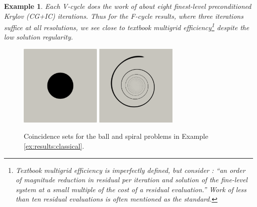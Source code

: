 \documentclass[letterpaper,final,12pt,reqno]{amsart}
\theoremstyle{cstyle}
\theoremstyle{cstyle*}
\theoremstyle{dstyle}
\newtheorem{example}[theorem]{Example}
\numberwithin{equation}{section}
\numberwithin{figure}{section}
\numberwithin{table}{section}
\numberwithin{theorem}{section}
\begin{document}
\begin{example}
Each V-cycle does the work of about eight finest-level preconditioned Krylov (CG+IC) iterations.  Thus for the F-cycle results, where three iterations suffice at all resolutions, we see close to textbook multigrid efficiency\footnote{Textbook multigrid efficiency is imperfectly defined, but consider \cite{BrownSmithAhmadia2013}: ``an order of magnitude reduction in residual per iteration and solution of the fine-level system at a small multiple of the cost of a residual evaluation.''  Work of less than ten residual evaluations is often mentioned as the standard.} despite the low solution regularity.
\end{example}

\begin{figure}[ht]
\begin{center}
\includegraphics[width=0.35\textwidth]{fixfigs/ball-set.png} \qquad \includegraphics[width=0.35\textwidth]{fixfigs/spiral-set.png}
\end{center}
\caption{Coincidence sets for the ball and spiral problems in Example \ref{ex:results:classical}.}
\label{fig:results:classical}
\end{figure}
\end{document}
